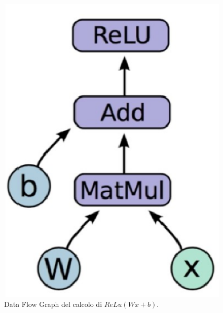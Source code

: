 \documentclass[a4paper,12pt]{report}
\begin{document}
\begin{figure}[!ht]
\centering
\includegraphics[scale=0.6]{flowgraph}
\caption{Data Flow Graph del calcolo di $ReLu(Wx+b)$.}
\end{figure}
\end{document}
